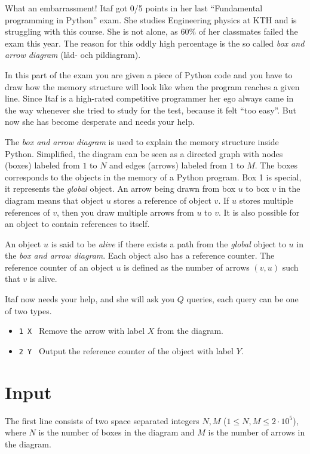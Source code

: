 
What an embarrassment! Itaf got 0/5 points in her last ``Fundamental programming in Python'' exam. 
She studies Engineering physics at KTH and is struggling with this course. She is not alone, 
as $60\%$ of her classmates failed the exam this year. The reason for this oddly high percentage 
is the so called \textit{box and arrow diagram} (låd- och pildiagram).

In this part of the exam you are given a piece of Python code and you have to draw how the memory 
structure will look like when the program reaches a given line. Since Itaf is a high-rated 
competitive programmer her ego always came in the way whenever she tried to study for the test, 
because it felt ``too easy''. But now she has become desperate and needs your help.

The \textit{box and arrow diagram} is used to explain the memory structure inside Python. 
Simplified, the diagram can be seen as a directed graph with nodes (boxes) labeled from $1$ to $N$ and 
edges (arrows) labeled from $1$ to $M$. The boxes corresponds to the objects in the memory
of a Python program. Box 1 is special, it represents the \textit{global} object.  
An arrow being drawn from box $u$ to box $v$ in the diagram means that object $u$ stores a reference 
of object $v$. If $u$ stores multiple references of $v$, then you draw multiple arrows 
from $u$ to $v$. It is also possible for an object to contain references to itself.

An object $u$ is said to be \textit{alive} if there exists a path from the \textit{global} 
object to $u$ in the \textit{box and arrow diagram}. Each object also has a reference counter. 
The reference counter of an object $u$ is defined as the number of arrows $(v,u)$ such that $v$ is alive. 

Itaf now needs your help, and she will ask you $Q$ queries, each query can be one of two types.

\begin{itemize}
	\item{\texttt{1 X} \, Remove the arrow with label $X$ from the diagram.}
	\item{\texttt{2 Y} \, Output the reference counter of the object with label $Y$.}
\end{itemize}

\section*{Input}
The first line consists of two space separated integers $N,M$ ($1 \leq N,M \leq 2 \cdot 10^5$), 
where $N$ is the number of boxes in the diagram and $M$ is the number of arrows in the diagram. 

